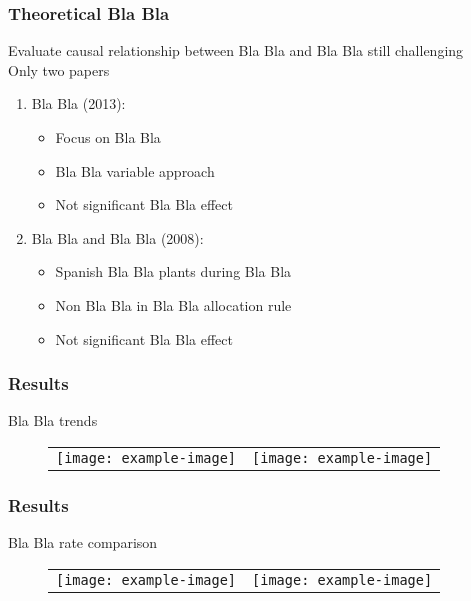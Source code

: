 \documentclass{beamer}
\begin{document}
\begin{frame}
\frametitle{Theoretical Bla Bla}
Evaluate causal relationship between Bla Bla and Bla Bla still challenging\\
Only two papers
\begin{enumerate}
\item Bla Bla (2013):
\begin{itemize}
\item Focus on Bla Bla
\item Bla Bla variable approach
\item Not significant Bla Bla effect \pause
\end{itemize}
\item Bla Bla and Bla Bla (2008):
\begin{itemize}
\item Spanish Bla Bla plants during Bla Bla 
\item Non Bla Bla in Bla Bla allocation rule
\item Not significant Bla Bla effect
\end{itemize}
\end{enumerate}
\end{frame}

\begin{frame}
\frametitle{Results}
\begin{center}
Bla Bla trends
\end{center}
\begin{figure}
\centering
\begin{tabular}{cc}
\texttt{[image: example-image]} &
\texttt{[image: example-image]}
\end{tabular}
\end{figure}
\end{frame}

\begin{frame}
\frametitle{Results}
\begin{center}
Bla Bla rate comparison
\end{center}
\begin{figure}
\centering
\begin{tabular}{cc}
\texttt{[image: example-image]} &
\texttt{[image: example-image]}
\end{tabular}
\end{figure}
\end{frame}
\end{document}
